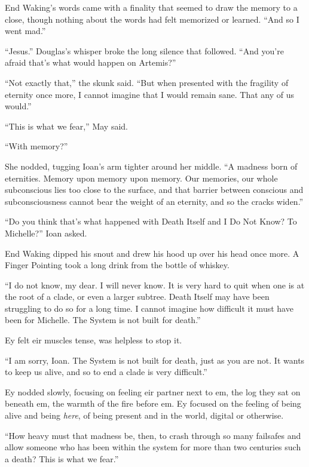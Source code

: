 End Waking's words came with a finality that seemed to draw the memory to a close, though nothing about the words had felt memorized or learned. ``And so I went mad.''

``Jesus.'' Douglas's whisper broke the long silence that followed. ``And you're afraid that's what would happen on Artemis?''

``Not exactly that,'' the skunk said. ``But when presented with the fragility of eternity once more, I cannot imagine that I would remain sane. That any of us would.''

``This is what we fear,'' May said.

``With memory?''

She nodded, tugging Ioan's arm tighter around her middle. ``A madness born of eternities. Memory upon memory upon memory. Our memories, our whole subconscious lies too close to the surface, and that barrier between conscious and subconsciousness cannot bear the weight of an eternity, and so the cracks widen.''

``Do you think that's what happened with Death Itself and I Do Not Know? To Michelle?'' Ioan asked.

End Waking dipped his snout and drew his hood up over his head once more. A Finger Pointing took a long drink from the bottle of whiskey.

``I do not know, my dear. I will never know. It is very hard to quit when one is at the root of a clade, or even a larger subtree. Death Itself may have been struggling to do so for a long time. I cannot imagine how difficult it must have been for Michelle. The System is not built for death.''

Ey felt eir muscles tense, was helpless to stop it.

``I am sorry, Ioan. The System is not built for death, just as you are not. It wants to keep us alive, and so to end a clade is very difficult.''

Ey nodded slowly, focusing on feeling eir partner next to em, the log they sat on beneath em, the warmth of the fire before em. Ey focused on the feeling of being alive and being \emph{here}, of being present and in the world, digital or otherwise.

``How heavy must that madness be, then, to crash through so many failsafes and allow someone who has been within the system for more than two centuries such a death? This is what we fear.''
